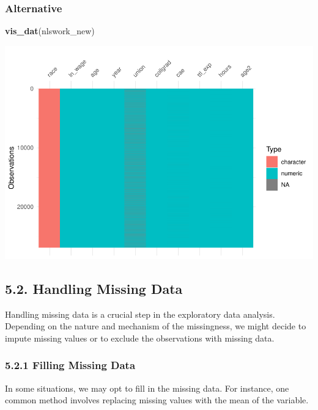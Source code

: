 \documentclass[
]{article}
\newenvironment{Shaded}{\begin{snugshade}}{\end{snugshade}}
\newcommand{\FunctionTok}[1]{\textcolor[rgb]{0.13,0.29,0.53}{\textbf{#1}}}
\newcommand{\NormalTok}[1]{#1}
\begin{document}
\hypertarget{alternative}{%
\subsubsection{Alternative}\label{alternative}}

\begin{Shaded}
\begin{Highlighting}[]
\FunctionTok{vis\_dat}\NormalTok{(nlswork\_new)}
\end{Highlighting}
\end{Shaded}

\includegraphics{RIntro_files/figure-latex/unnamed-chunk-10-1.pdf}

\hypertarget{handling-missing-data}{%
\subsection{5.2. Handling Missing Data}\label{handling-missing-data}}

Handling missing data is a crucial step in the exploratory data
analysis. Depending on the nature and mechanism of the missingness, we
might decide to impute missing values or to exclude the observations
with missing data.

\hypertarget{filling-missing-data}{%
\subsubsection{5.2.1 Filling Missing Data}\label{filling-missing-data}}

In some situations, we may opt to fill in the missing data. For
instance, one common method involves replacing missing values with the
mean of the variable.
\end{document}
